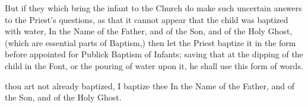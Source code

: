 \begin{rubric}
But if they which bring the infant to the Church do make such uncertain answers to the Priest's questions, as that it cannot appear that the child was baptized with water, In the Name of the Father, and of the Son, and of the Holy Ghost, (which are essential parts of Baptism,) then let the Priest baptize it in the form before appointed for Publick Baptism of Infants; saving that at the dipping of the child in the Font, or the pouring of water upon it, he shall use this form of words.
\end{rubric}

 thou art not already baptized,  I baptize thee In the Name of the Father, and of the Son, and of the Holy Ghost.
